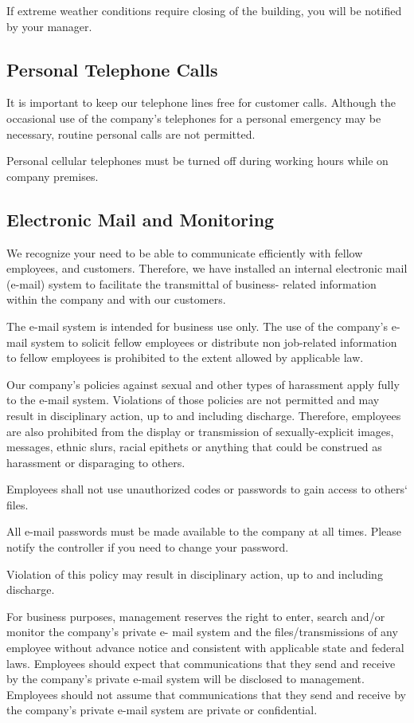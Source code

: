 \documentclass{book}
\begin{document}
If extreme weather conditions require closing of the building, you will be notified by your manager.

\subsection{Personal Telephone Calls}

It is important to keep our telephone lines free for customer calls. Although the occasional use of the company's telephones for a personal emergency may be necessary, routine personal calls are not permitted.

Personal cellular telephones must be turned off during working hours while on company premises.

\subsection{Electronic Mail and Monitoring}

We recognize your need to be able to communicate efficiently with fellow employees, and customers. Therefore, we have installed an internal electronic mail (e-mail) system to facilitate the transmittal of business- related information within the company and with our customers.

The e-mail system is intended for business use only. The use of the company's e-mail system to solicit fellow employees or distribute non job-related information to fellow employees is prohibited to the extent allowed by applicable law.

Our company's policies against sexual and other types of harassment apply fully to the e-mail system. Violations of those policies are not permitted and may result in disciplinary action, up to and including discharge. Therefore, employees are also prohibited from the display or transmission of sexually-explicit images, messages, ethnic slurs, racial epithets or anything that could be construed as harassment or disparaging to others.

Employees shall not use unauthorized codes or passwords to gain access to others‘ files.

All e-mail passwords must be made available to the company at all times. Please notify the controller if you need to change your password.

Violation of this policy may result in disciplinary action, up to and including discharge.

For business purposes, management reserves the right to enter, search and/or monitor the company's private e- mail system and the files/transmissions of any employee without advance notice and consistent with applicable state and federal laws. Employees should expect that communications that they send and receive by the company's private e-mail system will be disclosed to management. Employees should not assume that communications that they send and receive by the company's private e-mail system are private or confidential.
\end{document}
